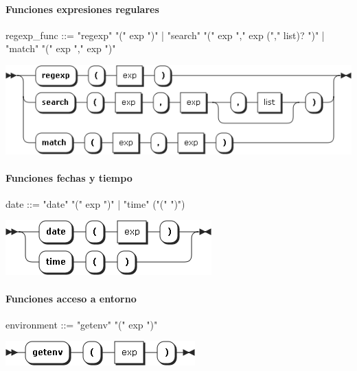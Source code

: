\paragraph{Funciones expresiones regulares}
\begin{myverbatim}      
regexp_func ::=   "regexp" "(" exp ")"
               |  "search" "(" exp "," exp ("," list)? ")"
               |  "match" "(" exp "," exp ")"
\end{myverbatim}  
\begin{center}
\includegraphics[scale=0.5]{diagram/regexp_func.png} \\
\end{center}

\paragraph{Funciones fechas y tiempo}
\begin{multicols}{2}
\begin{myverbatim}      
date ::= "date" "(" exp ")"
      |  "time" ("(" ")")
\end{myverbatim}  
\columnbreak	
\begin{center}
\includegraphics[scale=0.5]{diagram/date.png} \\
\end{center}
\end{multicols}

\paragraph{Funciones acceso a entorno}
\begin{multicols}{2}
\begin{myverbatim}      
environment ::= "getenv" "(" exp ")"
\end{myverbatim}  
\columnbreak	
\begin{center}
\includegraphics[scale=0.4]{diagram/environment.png} \\
\end{center}
\end{multicols}

